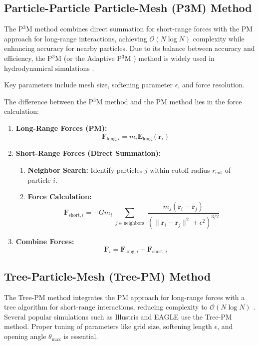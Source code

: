\subsection{Particle-Particle Particle-Mesh (P3M) Method}
The P$^3$M method combines direct summation for short-range forces with the PM approach for long-range interactions, achieving $\mathcal{O}(N \log N)$ complexity while enhancing accuracy for nearby particles. Due to its balance between accuracy and efficiency, the P$^3$M (or the Adaptive P$^3$M \citep{1991ApJ...368L..23C}) method is widely used in hydrodynamical simulations \citep{1995ApJ...452..797C, 2002A&A...385..337T}.

Key parameters include mesh size, softening parameter $\epsilon$, and force resolution.

The difference between the P$^3$M method and the PM method lies in the force calculation:
\begin{enumerate}
    \item \textbf{Long-Range Forces (PM):}
    \[
    \mathbf{F}_{\text{long},i} = m_i \mathbf{E}_{\text{long}}(\mathbf{r}_i)
    \]
    \item \textbf{Short-Range Forces (Direct Summation):}
    \begin{enumerate}[label={(\alph*)}]
        \item \textbf{Neighbor Search:}
        Identify particles $j$ within cutoff radius $r_{\text{cut}}$ of particle $i$.
        \item \textbf{Force Calculation:}
        \[
        \mathbf{F}_{\text{short},i} = -G m_i \sum_{\substack{j \in \text{neighbors}}} \frac{m_j (\mathbf{r}_i - \mathbf{r}_j)}{\left(\|\mathbf{r}_i - \mathbf{r}_j\|^2 + \epsilon^2\right)^{3/2}}
        \]
    \end{enumerate}
    \item \textbf{Combine Forces:}
    \[
    \mathbf{F}_i = \mathbf{F}_{\text{long},i} + \mathbf{F}_{\text{short},i}
    \]
\end{enumerate}

\subsection{Tree-Particle-Mesh (Tree-PM) Method}
The Tree-PM method integrates the PM approach for long-range forces with a tree algorithm for short-range interactions, reducing complexity to $\mathcal{O}(N \log N)$ \citep{1986Natur.324..446B}. Several popular simulations such as Illustris \citep{2014MNRAS.444.1518V} and EAGLE \citep{2015MNRAS.446..521S, 2015MNRAS.450.1937C, 2017arXiv170609899T} use the Tree-PM method.
Proper tuning of parameters like grid size, softening length $\epsilon$, and opening angle $\theta_{\text{max}}$ is essential.

